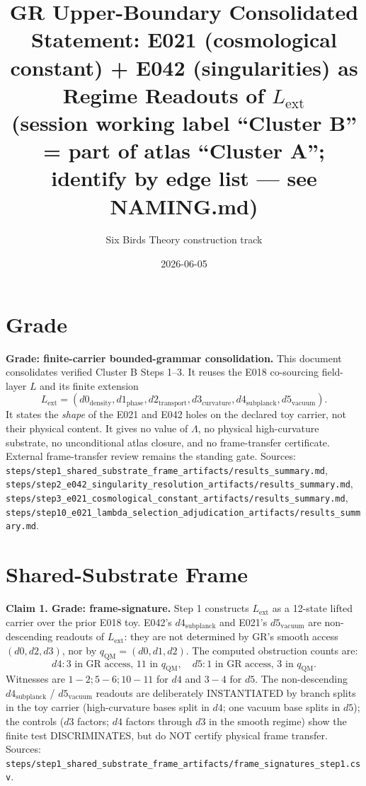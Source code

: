 \documentclass[11pt]{article}
\title{GR Upper-Boundary Consolidated Statement: E021 (cosmological constant) + E042 (singularities) as Regime Readouts of \(L_{\mathrm{ext}}\)\\ {\small (session working label ``Cluster B'' = part of atlas ``Cluster A''; identify by edge list --- see NAMING.md)}}
\author{Six Birds Theory construction track}
\date{2026-06-05}
\begin{document}
\maketitle

\section{Grade}

\textbf{Grade: finite-carrier bounded-grammar consolidation.}
This document consolidates verified Cluster B Steps 1--3. It reuses the E018 co-sourcing field-layer \(L\) and its finite extension
\[
L_{\mathrm{ext}}=(d0_{\mathrm{density}},d1_{\mathrm{phase}},d2_{\mathrm{transport}},d3_{\mathrm{curvature}},d4_{\mathrm{subplanck}},d5_{\mathrm{vacuum}}).
\]
It states the \emph{shape} of the E021 and E042 holes on the declared toy carrier, not their physical content. It gives no value of \(\Lambda\), no physical high-curvature substrate, no unconditional atlas closure, and no frame-transfer certificate. External frame-transfer review remains the standing gate.
Sources: \texttt{steps/step1\_shared\_substrate\_frame\_artifacts/results\_summary.md}, \texttt{steps/step2\_e042\_singularity\_resolution\_artifacts/results\_summary.md}, \texttt{steps/step3\_e021\_cosmological\_constant\_artifacts/results\_summary.md}, \texttt{steps/step10\_e021\_lambda\_selection\_adjudication\_artifacts/results\_summary.md}.

\section{Shared-Substrate Frame}

\textbf{Claim 1. Grade: frame-signature.}
Step 1 constructs \(L_{\mathrm{ext}}\) as a 12-state lifted carrier over the prior E018 toy. E042's \(d4_{\mathrm{subplanck}}\) and E021's \(d5_{\mathrm{vacuum}}\) are non-descending readouts of \(L_{\mathrm{ext}}\): they are not determined by GR's smooth access \((d0,d2,d3)\), nor by \(q_{\mathrm{QM}}=(d0,d1,d2)\). The computed obstruction counts are:
\[
d4: 3 \text{ in GR access, } 11 \text{ in } q_{\mathrm{QM}},
\quad
d5: 1 \text{ in GR access, } 3 \text{ in } q_{\mathrm{QM}}.
\]
Witnesses are \(1\!-\!2;5\!-\!6;10\!-\!11\) for \(d4\) and \(3\!-\!4\) for \(d5\).
The non-descending \(d4_{\mathrm{subplanck}}\) / \(d5_{\mathrm{vacuum}}\) readouts are deliberately INSTANTIATED by branch splits in the toy carrier (high-curvature bases split in \(d4\); one vacuum base splits in \(d5\)); the controls (\(d3\) factors; \(d4\) factors through \(d3\) in the smooth regime) show the finite test DISCRIMINATES, but do NOT certify physical frame transfer.
Sources: \texttt{steps/step1\_shared\_substrate\_frame\_artifacts/frame\_signatures\_step1.csv}.
\end{document}
